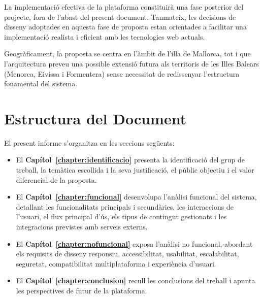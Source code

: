 La implementació efectiva de la plataforma constituirà una fase posterior del projecte, fora de l'abast del present document. Tanmateix, les decisions de disseny adoptades en aquesta fase de proposta estan orientades a facilitar una implementació realista i eficient amb les tecnologies web actuals.

Geogràficament, la proposta se centra en l'àmbit de l'illa de Mallorca, tot i que l'arquitectura preveu una possible extensió futura als territoris de les Illes Balears (Menorca, Eivissa i Formentera) sense necessitat de redissenyar l'estructura fonamental del sistema.

\section{Estructura del Document}

El present informe s'organitza en les seccions següents:

\begin{itemize}
    \item El \textbf{Capítol~\ref{chapter:identificacio}} presenta la identificació del grup de treball, la temàtica escollida i la seva justificació, el públic objectiu i el valor diferencial de la proposta.
    \item El \textbf{Capítol~\ref{chapter:funcional}} desenvolupa l'anàlisi funcional del sistema, detallant les funcionalitats principals i secundàries, les interaccions de l'usuari, el flux principal d'ús, els tipus de contingut gestionats i les integracions previstes amb serveis externs.
    \item El \textbf{Capítol~\ref{chapter:nofuncional}} exposa l'anàlisi no funcional, abordant els requisits de disseny responsiu, accessibilitat, usabilitat, escalabilitat, seguretat, compatibilitat multiplataforma i experiència d'usuari.
    \item El \textbf{Capítol~\ref{chapter:conclusion}} recull les conclusions del treball i apunta les perspectives de futur de la plataforma.
\end{itemize}
